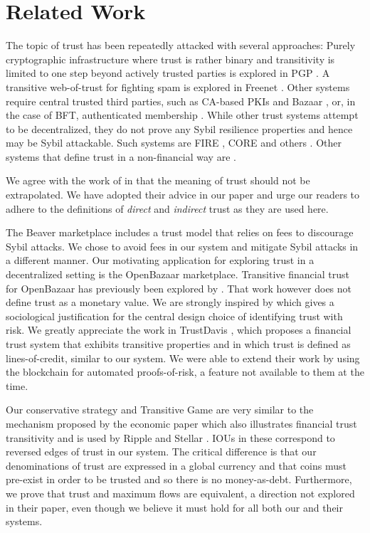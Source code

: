 \section{Related Work}
  The topic of trust has been repeatedly attacked with several approaches: Purely cryptographic infrastructure where trust
  is rather binary and transitivity is limited to one step beyond actively trusted parties is explored in PGP \cite{pgp}. A
  transitive web-of-trust for fighting spam is explored in Freenet \cite{freenet}. Other systems require central trusted
  third parties, such as CA-based PKIs \cite{pki} and Bazaar \cite{bazaar}, or, in the case of BFT, authenticated membership
  \cite{byzantine}. While other trust systems attempt to be decentralized, they do not prove any Sybil resilience properties
  and hence may be Sybil attackable. Such systems are FIRE \cite{fire}, CORE \cite{core} and others \cite{openrep,ghkkw,rk}.
  Other systems that define trust in a non-financial way are \cite{mui,beta,pace,vpc,sdt,wot,pathfinder}.

  We agree with the work of \cite{badtrust} in that the meaning of trust should not be extrapolated. We have adopted their
  advice in our paper and urge our readers to adhere to the definitions of \textit{direct} and \textit{indirect} trust as
  they are used here.

  The Beaver marketplace \cite{beaver} includes a trust model that relies on
  fees to discourage Sybil attacks. We chose to avoid fees in our system and mitigate Sybil attacks in a different manner.
  Our motivating application for exploring trust in a decentralized setting is the OpenBazaar marketplace. Transitive
  financial trust for OpenBazaar has previously been explored by \cite{dionyziz}. That work however does not define trust
  as a monetary value. We are strongly inspired by \cite{kmrs}
  which gives a sociological justification for the central design choice of identifying trust with
  risk. We greatly appreciate the work in TrustDavis \cite{davis}, which proposes a financial trust system that exhibits
  transitive properties and in which trust is defined as lines-of-credit, similar to our system. We were able to extend
  their work by using the blockchain for automated proofs-of-risk, a feature not available to them at the time.

  Our conservative strategy and Transitive Game are very similar to the mechanism proposed by the economic paper
  \cite{iou} which also illustrates financial trust transitivity and is used by Ripple \cite{ripple} and Stellar
  \cite{stellar}.  IOUs in these correspond to reversed edges of trust in our system. The critical difference is that our
  denominations of trust are expressed in a global currency and that coins must pre-exist in order to be trusted and so there
  is no money-as-debt. Furthermore, we prove that trust and maximum flows are equivalent, a direction not explored in their
  paper, even though we believe it must hold for all both our and their systems.
